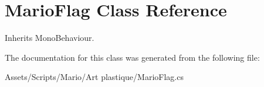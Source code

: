 \hypertarget{class_mario_flag}{\section{Mario\-Flag Class Reference}
\label{class_mario_flag}
}


Inherits Mono\-Behaviour.



The documentation for this class was generated from the following file\-:\begin{DoxyCompactItemize}
\item 
Assets/\-Scripts/\-Mario/\-Art plastique/Mario\-Flag.\-cs\end{DoxyCompactItemize}
